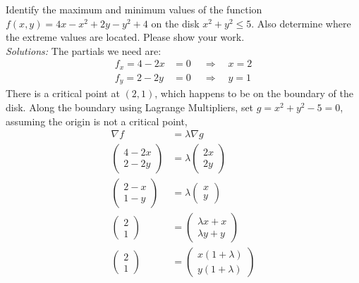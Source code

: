    \fi
    
\fi

\ifnum {}

    \question[6] Identify the maximum and minimum values of the function $f(x,y) = 4x - x^2 + 2y - y^2  + 4$ on the disk $x^2+y^2 \le 5$. Also determine where the extreme values are located. Please show your work. 
    \ifnum {} {\color{DarkBlue} \\ \textit{Solutions:} The partials we need are: 
    \begin{align*}
        f_x = 4 - 2x &=0 \ \quad \Rightarrow \quad x= 2 \\
        f_y = 2 - 2y &=0 \ \quad \Rightarrow \quad y= 1 
    \end{align*}
    There is a critical point at $(2,1)$, which happens to be on the boundary of the disk. Along the boundary using Lagrange Multipliers, set $g = x^2 + y^2 - 5 = 0$, assuming the origin is not a critical point,
    \begin{align*}
        \nabla f &= \lambda \nabla g \\
        \begin{pmatrix} 4 - 2x \\ 2 - 2y \end{pmatrix} &= \lambda \begin{pmatrix} 2x\\2y \end{pmatrix} \\ 
        \begin{pmatrix} 2 - x \\ 1 - y \end{pmatrix} &= \lambda \begin{pmatrix} x\\y \end{pmatrix} \\ 
        \begin{pmatrix} 2 \\ 1 \end{pmatrix} &= \begin{pmatrix} \lambda x + x\\ \lambda y + y \end{pmatrix} \\ 
        \begin{pmatrix} 2 \\ 1 \end{pmatrix} &= \begin{pmatrix} x(1 + \lambda )\\  y( 1 + \lambda) \end{pmatrix} \\ 

\end{align*}}
